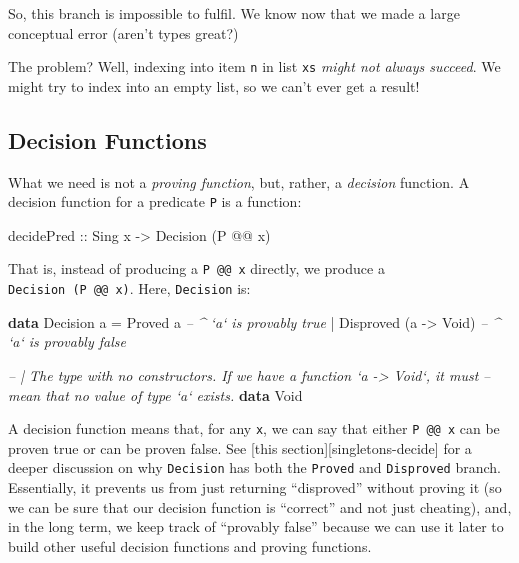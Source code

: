 \documentclass[]{article}
\newenvironment{Shaded}{}{}
\newcommand{\CommentTok}[1]{\textcolor[rgb]{0.38,0.63,0.69}{\textit{#1}}}
\newcommand{\DataTypeTok}[1]{\textcolor[rgb]{0.56,0.13,0.00}{#1}}
\newcommand{\FunctionTok}[1]{\textcolor[rgb]{0.02,0.16,0.49}{#1}}
\newcommand{\KeywordTok}[1]{\textcolor[rgb]{0.00,0.44,0.13}{\textbf{#1}}}
\newcommand{\NormalTok}[1]{#1}
\newcommand{\OtherTok}[1]{\textcolor[rgb]{0.00,0.44,0.13}{#1}}
\begin{document}
So, this branch is impossible to fulfil. We know now that we made a large
conceptual error (aren't types great?)

The problem? Well, indexing into item \texttt{n} in list \texttt{xs} \emph{might
not always succeed}. We might try to index into an empty list, so we can't ever
get a result!

\hypertarget{decision-functions}{%
\subsection{Decision Functions}\label{decision-functions}}

What we need is not a \emph{proving function}, but, rather, a \emph{decision}
function. A decision function for a predicate \texttt{P} is a function:

\begin{Shaded}
\begin{Highlighting}[]
\OtherTok{decidePred ::} \DataTypeTok{Sing}\NormalTok{ x}
           \OtherTok{->} \DataTypeTok{Decision}\NormalTok{ (}\DataTypeTok{P} \FunctionTok{@@}\NormalTok{ x)}
\end{Highlighting}
\end{Shaded}

That is, instead of producing a \texttt{P\ @@\ x} directly, we produce a
\texttt{Decision\ (P\ @@\ x)}. Here, \texttt{Decision} is:

\begin{Shaded}
\begin{Highlighting}[]
\KeywordTok{data} \DataTypeTok{Decision}\NormalTok{ a}
    \FunctionTok{=} \DataTypeTok{Proved}\NormalTok{     a                }\CommentTok{-- ^ `a` is provably true}
    \FunctionTok{|} \DataTypeTok{Disproved}\NormalTok{ (a }\OtherTok{->} \DataTypeTok{Void}\NormalTok{)       }\CommentTok{-- ^ `a` is provably false}

\CommentTok{-- | The type with no constructors.  If we have a function `a -> Void`, it must}
\CommentTok{-- mean that no value of type `a` exists.}
\KeywordTok{data} \DataTypeTok{Void}
\end{Highlighting}
\end{Shaded}

A decision function means that, for any \texttt{x}, we can say that either
\texttt{P\ @@\ x} can be proven true or can be proven false. See {[}this
section{]}{[}singletons-decide{]} for a deeper discussion on why
\texttt{Decision} has both the \texttt{Proved} and \texttt{Disproved} branch.
Essentially, it prevents us from just returning ``disproved'' without proving it
(so we can be sure that our decision function is ``correct'' and not just
cheating), and, in the long term, we keep track of ``provably false'' because we
can use it later to build other useful decision functions and proving functions.
\end{document}
